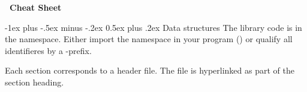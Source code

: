 \documentclass[10pt,landscape]{article}
\makeatletter
\renewcommand{\section}{\@startsection{section}{1}{0mm}%
                                {-1ex plus -.5ex minus -.2ex}%
                                {0.5ex plus .2ex}%
                                {\normalfont\large\bfseries}}
\makeatother
\begin{document}
\begin{multicols}{3}
\newcommand{\sdslwtblcd}{\code{wt\_blcd}}
\newcommand{\sdslwtint}{\code{wt\_int}}
\newcommand{\sdslwmint}{\code{wm\_int}}
\newcommand{\sdslwtgmr}{\code{wt\_gmr}}
\newcommand{\sdslwtrlmn}{\code{wt\_rlmn}}
\newcommand{\sdslcsabitcompressed}{\code{csa\_bitcompressed}}
\newcommand{\sdslcsasada}{\code{csa\_sada}}
\newcommand{\sdslcsawt}{\code{csa\_wt}}
\newcommand{\sdslbytealphabetstrategy}{\code{byte\_alphabet}}
\newcommand{\sdslsuccinctbytealphabetstrategy}{\code{succinct\_byte\_alphabet}}
\newcommand{\sdslintalphabetstrategy}{\code{int\_alphabet}}
\newcommand{\sdslsaordersasampling}{\code{sa\_order\_sa\_sampling}}
\newcommand{\sdsltextordersasampling}{\code{text\_order\_sa\_sampling}}

\newcommand{\sdsllcpbitcompressed}{\code{lcp\_bitcompressed}}
\newcommand{\sdsllcpdac}{\code{lcp\_dac}}
\newcommand{\sdsllcpvlc}{\code{lcp\_vlc}}
\newcommand{\sdsllcpbyte}{\code{lcp\_byte}}
\newcommand{\sdsllcpsupportsada}{\code{lcp\_support\_sada}}
\newcommand{\sdsllcpwt}{\code{lcp\_wt}}
\newcommand{\sdsllcpsupporttree}{\code{lcp\_support\_tree}}
\newcommand{\sdsllcpsupporttreeII}{\code{lcp\_support\_tree2}}
\newcommand{\sdslbpsupportg}{\code{bp\_support\_g}}
\newcommand{\sdslbpsupportgg}{\code{bp\_support\_gg}}
\newcommand{\sdslbpsupportsada}{\code{bp\_support\_sada}}
\newcommand{\sdslcstsada}{\code{cst\_sada}}
\newcommand{\sdslcstsctIII}{\code{cst\_sct3}}
\newcommand{\sdslrmqsupportsparsetable}{\code{rmq\_support\_sparse\_table}}
\newcommand{\sdslrmqsuccinctsada}{\code{rmq\_succint\_sada}}
\newcommand{\sdslrmqsuccinctsct}{\code{rmq\_succint\_sct}}

\newcommand{\myYES}{$\checkmark$}
\newcommand{\myNO}{$\times$}

\begin{center}
     \Large{\textbf{\sdsl\ Cheat Sheet}} \\
\end{center}

\section{Data structures}
The library code is in the  namespace. Either import
the namespace in your program () or
qualify all identifieres by a -prefix.

Each section corresponds to a header file. The file
is hyperlinked as part of the section heading.


\end{multicols}
\end{document}
